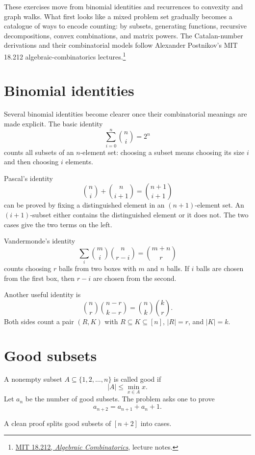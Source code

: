 
These exercises move from binomial identities and recurrences to convexity and graph walks.  What first looks like a mixed problem set gradually becomes a catalogue of ways to encode counting: by subsets, generating functions, recursive decompositions, convex combinations, and matrix powers. The Catalan-number derivations and their combinatorial models follow Alexander Postnikov's MIT 18.212 algebraic-combinatorics lectures.\footnote{\href{https://ocw.mit.edu/courses/18-212-algebraic-combinatorics-spring-2019/pages/lecture-notes/}{MIT 18.212, \emph{Algebraic Combinatorics}}, lecture notes.}

\section{Binomial identities}

Several binomial identities become clearer once their combinatorial meanings are made explicit.  The basic identity
\[
  \sum_{i=0}^n \binom ni=2^n
\]
counts all subsets of an $n$-element set: choosing a subset means choosing its size $i$ and then choosing $i$ elements.

Pascal's identity
\[
  \binom ni+\binom n{i+1}=\binom{n+1}{i+1}
\]
can be proved by fixing a distinguished element in an $(n+1)$-element set.  An $(i+1)$-subset either contains the distinguished element or it does not.  The two cases give the two terms on the left.

Vandermonde's identity
\[
  \sum_i \binom mi \binom n{r-i}=\binom{m+n}{r}
\]
counts choosing $r$ balls from two boxes with $m$ and $n$ balls.  If $i$ balls are chosen from the first box, then $r-i$ are chosen from the second.

Another useful identity is
\[
  \binom nr \binom{n-r}{k-r}=\binom nk \binom kr.
\]
Both sides count a pair $(R,K)$ with $R\subseteq K\subseteq[n]$, $|R|=r$, and $|K|=k$.

\section{Good subsets}

A nonempty subset $A\subseteq\{1,2,\ldots,n\}$ is called good if
\[
  |A|\le \min_{x\in A}x.
\]
Let $a_n$ be the number of good subsets.  The problem asks one to prove
\[
  a_{n+2}=a_{n+1}+a_n+1.
\]

A clean proof splits good subsets of $[n+2]$ into cases.

